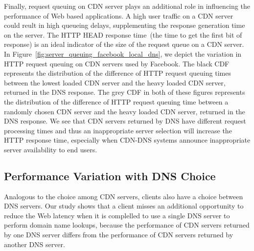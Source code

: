 \documentclass{llncs}
\begin{document}
Finally, request queuing on CDN server plays an additional role in influencing the performance of Web based applications.
A high user traffic on a CDN server could reult in high queueing delays, supplementing the response generation time on the server.
The HTTP HEAD response time~(the time to get the first bit of response) is an ideal indicator of the size of the request queue on a CDN server.
In Figure~\ref{fig:server_queuing_facebook_local_dns}, we depict the  variation in HTTP request queuing on CDN servers used by Facebook.
The black CDF represents the distribution of the difference of HTTP request queuing times between the lowest loaded CDN server and the heavy loaded CDN server, returned in the DNS response.
The grey CDF in both of these figures represents the distribution of the difference of HTTP request queuing time between a randomly chosen CDN server and the heavy loaded CDN server, returned in the DNS response.
We see that CDN servers returned by DNS have different request processing times and thus an inappropriate server selection will increase the HTTP response time, especially when CDN-DNS systems announce inappropriate server availability to end users.



\subsection{Performance Variation with DNS Choice}

Analogous to the choice among CDN servers, clients also have a choice between DNS servers.
Our study shows that a client misses an additional opportunity to reduce the Web latency when it is complelled to use a single DNS server to perform domain name lookups, because the performance of CDN servers returned by one DNS server differs from the performance of CDN servers returned by another DNS server.

\end{document}
